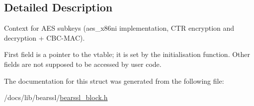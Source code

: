 \subsection{Detailed Description}
Context for A\+ES subkeys ({\ttfamily aes\+\_\+x86ni} implementation, C\+TR encryption and decryption + C\+B\+C-\/\+M\+AC). 

First field is a pointer to the vtable; it is set by the initialisation function. Other fields are not supposed to be accessed by user code. 

The documentation for this struct was generated from the following file\+:\begin{DoxyCompactItemize}
\item 
/docs/lib/bearssl/\hyperlink{bearssl__block_8h}{bearssl\+\_\+block.\+h}\end{DoxyCompactItemize}
